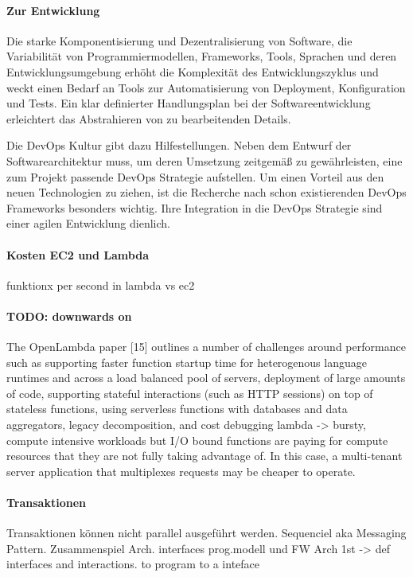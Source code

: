 \documentclass[
12pt,
english,
ngerman,
headsepline,
twoside,
openright,
numbers=noenddot,version=first
]{scrreprt}
\begin{document}
\paragraph{Zur Entwicklung}
Die starke Komponentisierung und Dezentralisierung von Software, die Variabilität von Programmiermodellen, Frameworks, Tools, Sprachen und deren Entwicklungsumgebung erhöht die Komplexität des Entwicklungszyklus und weckt einen Bedarf an Tools zur Automatisierung von Deployment, Konfiguration und Tests. Ein klar definierter Handlungsplan bei der Softwareentwicklung  erleichtert das Abstrahieren von zu bearbeitenden Details.

Die DevOps Kultur gibt dazu Hilfestellungen. Neben dem Entwurf der Softwarearchitektur muss, um deren Umsetzung zeitgemäß zu gewährleisten, eine zum Projekt passende DevOps Strategie aufstellen.
Um einen Vorteil aus den neuen Technologien zu ziehen, ist die Recherche nach schon existierenden DevOps Frameworks besonders wichtig. Ihre Integration in die DevOps Strategie sind einer agilen Entwicklung dienlich.

\paragraph{Kosten EC2 und Lambda}

funktionx per second in lambda vs ec2


\paragraph{TODO: downwards on}
The OpenLambda paper [15]
outlines a number of challenges around performance such as supporting faster function
startup time for heterogenous language runtimes and across a load balanced
pool of servers, deployment of large amounts of code, supporting stateful interactions
(such as HTTP sessions) on top of stateless functions, using serverless functions
with databases and data aggregators, legacy decomposition, and cost debugging
lambda ->  bursty, compute intensive workloads
but
I/O bound functions are paying for compute resources that they
are not fully taking advantage of. In this case, a multi-tenant server application that
multiplexes requests may be cheaper to operate.


\paragraph{Transaktionen}
Transaktionen können nicht parallel ausgeführt werden. Sequenciel aka Messaging Pattern.
Zusammenspiel Arch. interfaces prog.modell und FW
Arch 1st -> def interfaces and interactions. to program to a inteface
\end{document}
